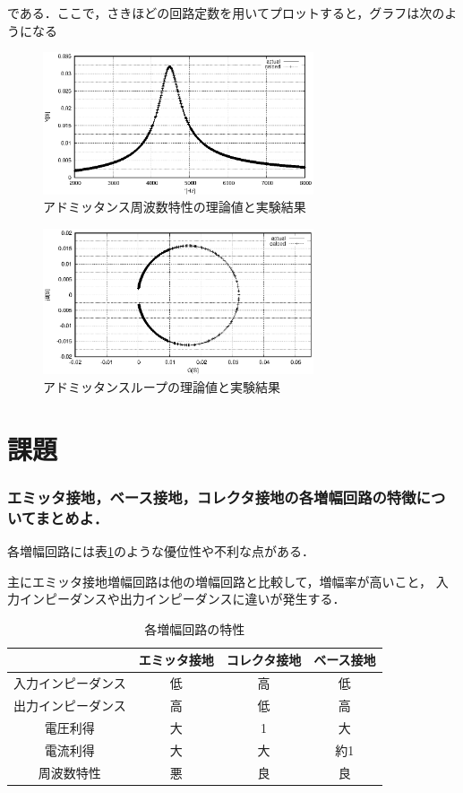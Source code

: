\documentclass[dvipdfmx,titlepage,a4j]{jsarticle}  %
\numberwithin{equation}{section}
\begin{document}
である．ここで，さきほどの回路定数を用いてプロットすると，グラフは次のようになる

\begin{figure}[H]
  \centering
  \includegraphics[width=8cm]{../gnuplot/A_YTheta_2.eps}
  \caption{アドミッタンス周波数特性の理論値と実験結果}
  \label{fig:A_YTheta_2.eps}
\end{figure}

\begin{figure}[H]
  \centering
  \includegraphics[width=8cm]{../gnuplot/A_GB_2.eps}
  \caption{アドミッタンスループの理論値と実験結果}
  \label{fig:A_GB_2.eps}
\end{figure}


\section{課題}

\subsubsection{エミッタ接地，ベース接地，コレクタ接地の各増幅回路の特徴についてまとめよ．}
各増幅回路には表\ref{tab:feature}のような優位性や不利な点がある．

主にエミッタ接地増幅回路は他の増幅回路と比較して，増幅率が高いこと，
入力インピーダンスや出力インピーダンスに違いが発生する．

\begin{table}[h]
  \caption{各増幅回路の特性}
  \label{tab:feature}
  \centering
  \begin{tabular}{c|ccc} \hline
                       & エミッタ接地 & コレクタ接地 & ベース接地 \\ \hline\hline
    入力インピーダンス & 低           & 高           & 低         \\\hline
    出力インピーダンス & 高           & 低           & 高         \\\hline
    電圧利得           & 大           & 1            & 大         \\\hline
    電流利得           & 大           & 大           & 約1        \\\hline
    周波数特性         & 悪           & 良           & 良         \\ \hline
  \end{tabular}
\end{table}
\end{document}
